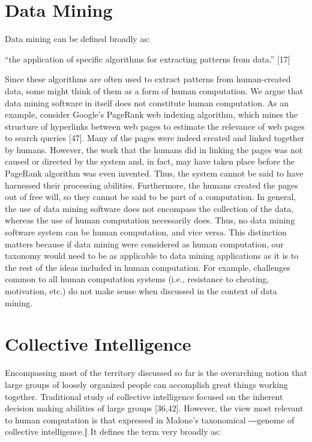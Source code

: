 \documentclass{acm_proc_article-sp} %
\begin{document}
\section{Data Mining} Data mining can be defined broadly as: 

“the application of specific algorithms for extracting patterns from data.” [17] 

Since these algorithms are often used to extract patterns from human-created data, some might think of them as a form of human computation.  We argue that data mining software in itself does not constitute human computation. As an example, consider Google’s PageRank web indexing algorithm, which mines the structure of hyperlinks between web pages to estimate the relevance of web pages to search queries [47].  Many of the pages were indeed created and linked together by humans.  However, the work that the humans did in linking the pages was not caused or directed by the system and, in fact, may have taken place before the PageRank algorithm was even invented.  Thus, the system cannot be said to have harnessed their processing abilities.  Furthermore, the humans created the pages out of free will, so they cannot be said to be part of a computation. In general, the use of data mining software does not encompass the collection of the data, whereas the use of human computation necessarily does. Thus, no data mining software system can be human computation, and vice versa. This distinction matters because if data mining were considered as human computation, our taxonomy would need to be as applicable to data mining applications as it is to the rest of the ideas included in human computation.  For example, challenges common to all human computation systems (i.e., resistance to cheating, motivation, etc.) do not make sense when discussed in the context of data mining. 

\section{Collective Intelligence} Encompassing most of the territory discussed so far is the overarching notion that large groups of loosely organized people can accomplish great things working together. Traditional study of collective intelligence focused on the inherent decision making abilities of large groups [36,42]. However, the view most relevant to human computation is that expressed in Malone’s taxonomical ―genome of collective intelligence.‖  It defines the term very broadly as: 
\end{document}
